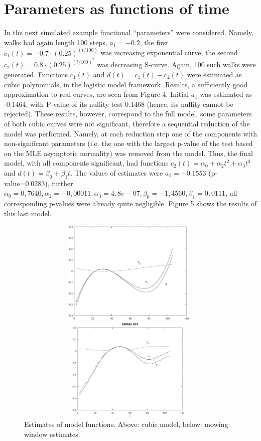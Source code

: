 \documentclass[11pt]{article}
\begin{document}
\section{Parameters as functions of time}

In the next simulated example functional ``parameters'' were
considered. Namely, walks had again length 100 steps, $a_1=-0.2$,
the first $c_1(t)=-0.7\cdot (0.25)^{(t/100)}$ was increasing
exponential curve, the second $c_2(t)=0.8\cdot (0.25)^{(t/100)^2}$
was decreasing S-curve. Again, 100 such walks were generated.
Functions $c_1(t)$ and $d(t)=c_1(t)-c_2(t)$ were estimated as
cubic polynomials, in the logistic model framework. Results,
a sufficiently good approximation to real curves, are seen from
Figure 4. Initial $a_1$ was estimated as -0.1464, with P-value of
its nullity test 0.1468 (hence, its nullity cannot be rejected).
These results, however, correspond to the full model, some
parameters of both cubic curves were not significant, therefore a
sequential reduction of the model was performed. Namely, at each
reduction step one of the components with non-significant
parameters (i.e. the one with the largest p-value of the test
based on the MLE asymptotic normality) was removed from the model.
Thus, the final model, with all components significant, had
functions $c_2(t)=\alpha_0+\alpha_2 t^2+\alpha_3 t^3$ and
$d(t)=\beta_0+\beta_1 t$. The values of estimates were
$a_1=-0.1553$ (p-value=0.0283), further $\alpha_0=0,7640,
\alpha_2= -0,00011, \alpha_3=4,8e-07, \beta_0=-1,4560,
\beta_1=0,0111$, all corresponding p-values were already quite
negligible. Figure 5 shows the results of this last model.


\begin{figure}[h]
\centering
    \includegraphics[width = 11cm,height=5cm]{comp_polyn.eps}

\centering
   \includegraphics[width = 11cm,height=5cm]{comp_kern.eps}
\caption{Estimates of model functions. Above: cubic model, below: mowing window estimates.}
\end{figure}
\end{document}
